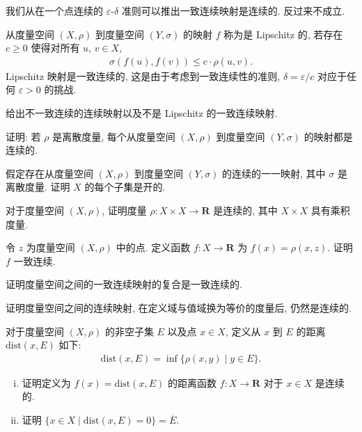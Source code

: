 \documentclass[../../main.tex]{subfiles}
\begin{document}
我们从在一个点连续的 $\varepsilon$-$\delta$ 准则可以推出一致连续映射是连续的. 反过来不成立.

\begin{example}[Lipschitz 映射]\label{example:ch09-Lipschitz}
从度量空间 $(X,\rho)$ 到度量空间 $(Y,\sigma)$ 的映射 $f$ 称为是 Lipschitz 的, 若存在 $c\geqslant 0$ 使得对所有 $u$, $v\in X$,
\begin{align*}
\sigma(f(u),f(v))\leqslant c\cdot\rho(u,v).
\end{align*}
Lipschitz 映射是一致连续的, 这是由于考虑到一致连续性的准则, $\delta=\varepsilon/c$ 对应于任何 $\varepsilon>0$ 的挑战.
\end{example}

\begin{exercise}\label{exercise:ch09-26}
给出不一致连续的连续映射以及不是 Lipschitz 的一致连续映射.
\end{exercise}

\begin{exercise}\label{exercise:ch09-27}
证明: 若 $\rho$ 是离散度量, 每个从度量空间 $(X,\rho)$ 到度量空间 $(Y,\sigma)$ 的映射都是连续的.
\end{exercise}

\begin{exercise}\label{exercise:ch09-28}
假定存在从度量空间 $(X,\rho)$ 到度量空间 $(Y,\sigma)$ 的连续的一一映射, 其中 $\sigma$ 是离散度量. 证明 $X$ 的每个子集是开的.
\end{exercise}

\begin{exercise}\label{exercise:ch09-29}
对于度量空间 $(X,\rho)$, 证明度量 $\rho:X\times X\to\mathbf{R}$ 是连续的, 其中 $X\times X$ 具有乘积度量.
\end{exercise}

\begin{exercise}\label{exercise:ch09-30}
令 $z$ 为度量空间 $(X,\rho)$ 中的点. 定义函数 $f:X\to\mathbf{R}$ 为 $f(x)=\rho(x,z)$. 证明 $f$ 一致连续.
\end{exercise}

\begin{exercise}\label{exercise:ch09-31}
证明度量空间之间的一致连续映射的复合是一致连续的.
\end{exercise}

\begin{exercise}\label{exercise:ch09-32}
证明度量空间之间的连续映射, 在定义域与值域换为等价的度量后, 仍然是连续的.
\end{exercise}

\begin{exercise}\label{exercise:ch09-33}
对于度量空间 $(X,\rho)$ 的非空子集 $E$ 以及点 $x\in X$, 定义从 $x$ 到 $E$ 的距离 $\mathrm{dist}(x,E)$ 如下:
\begin{align*}
\mathrm{dist}(x,E)=\inf\{\rho(x,y)\mid y\in E\}.
\end{align*}
\begin{enumerate}[(i)]
\item 证明定义为 $f(x)=\mathrm{dist}(x,E)$ 的距离函数 $f:X\to\mathbf{R}$ 对于 $x\in X$ 是连续的.
\item 证明 $\{x\in X\mid\mathrm{dist}(x,E)=0\}=\overline{E}$.
\end{enumerate}
\end{exercise}
\end{document}
